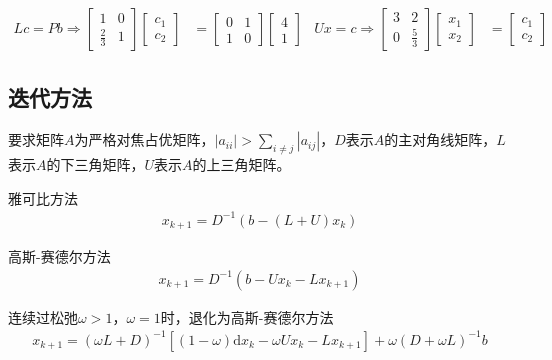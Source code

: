 \documentclass[twocolumn]{article}
\begin{document}
\begin{align*}
    Lc=Pb\Rightarrow
    \begin{bmatrix}
        1           & 0 \\
        \frac{2}{3} & 1
    \end{bmatrix}
    \begin{bmatrix}
        c_1 \\
        c_2
    \end{bmatrix}
     & =
    \begin{bmatrix}
        0 & 1 \\
        1 & 0
    \end{bmatrix}
    \begin{bmatrix}
        4 \\
        1
    \end{bmatrix}
     &
    Ux=c \Rightarrow
    \begin{bmatrix}
        3 & 2           \\
        0 & \frac{5}{3}
    \end{bmatrix}
    \begin{bmatrix}
        x_1 \\
        x_2
    \end{bmatrix}
     & =
    \begin{bmatrix}
        c_1 \\
        c_2
    \end{bmatrix}
\end{align*}

\subsection{迭代方法}
要求矩阵$A$为严格对焦占优矩阵，$|a_{ii}|>\sum_{i\neq j}|a_{ij}|$，$D$表示$A$的主对角线矩阵，$L$表示$A$的下三角矩阵，$U$表示$A$的上三角矩阵。

雅可比方法
\begin{align*}
    x_{k+1}=D^{-1}(b-(L+U)x_k)
\end{align*}

高斯-赛德尔方法
\begin{align*}
    x_{k+1}=D^{-1}(b-Ux_k-Lx_{k+1})
\end{align*}

连续过松弛$\omega>1$，$\omega=1$时，退化为高斯-赛德尔方法
\begin{align*}
    x_{k+1}=(\omega L+D)^{-1}[(1-\omega)\mathrm{d}x_k-\omega Ux_k-Lx_{k+1}]+\omega(D+\omega L)^{-1}b
\end{align*}
\end{document}
